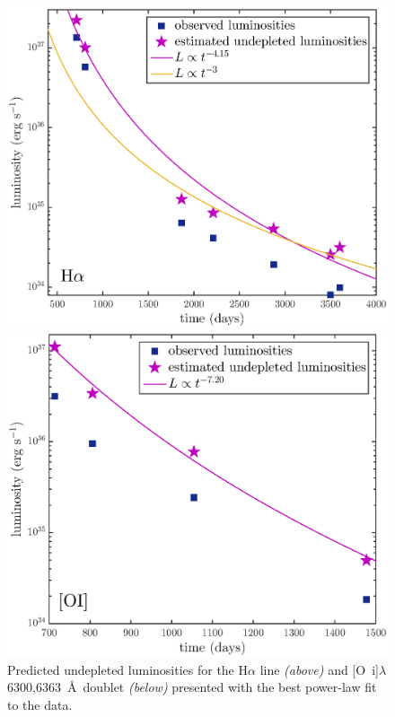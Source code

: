 \documentclass[useAMS,usenatbib,usegraphicx]{mnras}
\begin{document}
\begin{figure}

\includegraphics[clip=true,scale=0.47]{undep_fluxes_Ha}

\vspace{2mm} \includegraphics[clip=true,scale=0.47]{undep_lum_OI}


\caption{Predicted undepleted luminosities for the H$\alpha$ line \textit{(above)}  and [O~{\sc i}]$\lambda$6300,6363~\AA\ doublet \textit{(below)} presented with the best power-law fit to the data.}
\label{undep}

\end{figure}
\end{document}
